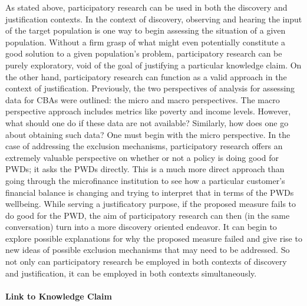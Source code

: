 \documentclass[a4paper]{article}
\begin{document}
As stated above, participatory research can be used in both the discovery and
justification contexts. In the context of discovery, observing and hearing the
input of the target population is one way to begin assessing the situation of
a given population. Without a firm grasp of what might even potentially
constitute a good solution to a given population's problem, participatory
research can be purely exploratory, void of the goal of justifying a
particular knowledge claim. On the other hand, participatory research can
function as a valid approach in the context of justification. Previously, the
two perspectives of analysis for assessing data for CBAs were outlined: the
micro and macro perspectives. The macro perspective approach includes metrics
like poverty and income levels. However, what should one do if these data are
not available? Similarly, how does one go about obtaining such data? One must
begin with the micro perspective. In the case of addressing the exclusion
mechanisms, participatory research offers an extremely valuable perspective on
whether or not a policy is doing good for PWDs; it asks the PWDs directly.
This is a much more direct approach than going through the microfinance
institution to see how a particular customer's financial balance is changing
and trying to interpret that in terms of the PWDs wellbeing. While serving a
justificatory purpose, if the proposed measure fails to do good for the PWD,
the aim of participatory research can then (in the same conversation) turn
into a more discovery oriented endeavor. It can begin to explore possible
explanations for why the proposed measure failed and give rise to new ideas of
possible exclusion mechanisms that may need to be addressed. So not only can
participatory research be employed in both contexts of discovery and
justification, it can be employed in both contexts simultaneously.


\paragraph{Link to Knowledge Claim}
\end{document}
